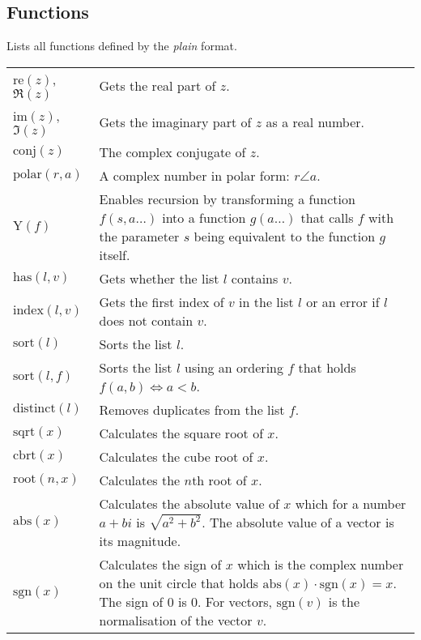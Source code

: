 \documentclass[10pt]{article}
\newcommand{\tabgap}{\vspace{3mm}\\}
\begin{document}
    \subsection{Functions}
    Lists all functions defined by the \textit{plain} format.
    \begin{longtable}{p{}p{}}
        $ \mathrm{re}(z) $, $ \Re(z) $             & Gets the real part of $ z $. \\
        $ \mathrm{im}(z) $, $ \Im(z) $             & Gets the imaginary part of $ z $ as a real number. \\
        $ \mathrm{conj}(z) $                       & The complex conjugate of $ z $. \\
        $ \mathrm{polar}(r, a) $                   & A complex number in polar form: $ r \angle a $. \tabgap
        $ \mathrm{Y}(f) $                          & Enables recursion by transforming a function $ f(s,a\dots) $ into a function $ g(a\dots) $ that calls $ f $ with the parameter $ s $ being equivalent to the function $ g $ itself. \tabgap
        $ \mathrm{has}(l, v) $                     & Gets whether the list $ l $ contains $ v $. \\
        $ \mathrm{index}(l, v) $                   & Gets the first index of $ v $ in the list $ l $ or an error if $ l $ does not contain $ v $. \\
        $ \mathrm{sort}(l) $                       & Sorts the list $ l $. \\
        $ \mathrm{sort}(l, f) $                    & Sorts the list $ l $ using an ordering $ f $ that holds $ f(a, b) \iff a < b $. \\
        $ \mathrm{distinct}(l) $                   & Removes duplicates from the list $ f $. \tabgap
        $ \mathrm{sqrt}(x) $                       & Calculates the square root of $ x $. \\
        $ \mathrm{cbrt}(x) $                       & Calculates the cube root of $ x $. \\
        $ \mathrm{root}(n, x) $                    & Calculates the $ n $th root of $ x $. \tabgap
        $ \mathrm{abs}(x) $                        & Calculates the absolute value of $ x $ which for a number $ a + bi$ is $ \sqrt{a^2 + b^2} $. The absolute value of a vector is its magnitude. \\
        $ \mathrm{sgn}(x) $                        & Calculates the sign of $ x $ which is the complex number on the unit circle that holds $ \mathrm{abs}(x) \cdot \mathrm{sgn}(x) = x $. The sign of $ 0 $ is $ 0 $. For vectors, $ \mathrm{sgn}(v) $ is the normalisation of the vector $ v $. \tabgap

\end{longtable}
\end{document}
